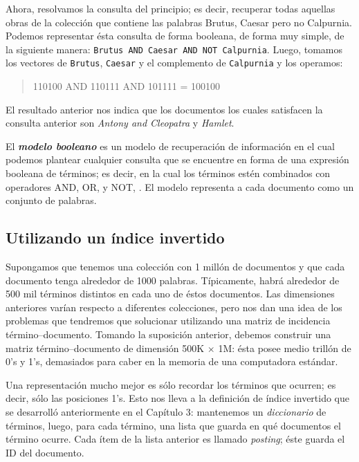 	Ahora, resolvamos la consulta del principio; es decir, recuperar todas aquellas obras de la colección que contiene las palabras Brutus, Caesar pero no Calpurnia. Podemos representar ésta consulta de forma booleana, de forma muy simple, de la siguiente manera: \texttt{Brutus AND Caesar AND NOT Calpurnia}. Luego, tomamos los vectores de \texttt{Brutus}, \texttt{Caesar} y el complemento de \texttt{Calpurnia} y los operamos:
	\begin{quote}
		\begin{ttfamily}
			110100 AND 110111 AND 101111 = 100100
		\end{ttfamily}
	\end{quote}
	El resultado anterior nos indica que los documentos los cuales satisfacen la consulta anterior son \textit{Antony and Cleopatra} y \textit{Hamlet}. \par
	
	El \textbf{\textit{modelo booleano}} es un modelo de recuperación de información en el cual podemos plantear cualquier consulta que se encuentre en forma de una expresión booleana de términos; es decir, en la cual los términos estén combinados con operadores AND, OR, y NOT, \cite{manning2009}. El modelo representa a cada documento como un conjunto de palabras.
	
	\subsection{Utilizando un índice invertido}
		Supongamos que tenemos una colección con 1 millón de documentos y que cada documento tenga alrededor de 1000 palabras. Típicamente, habrá alrededor de 500 mil términos distintos en cada uno de éstos documentos. Las dimensiones anteriores varían respecto a diferentes colecciones, pero nos dan una idea de los problemas que tendremos que solucionar utilizando una matriz de incidencia término--documento. Tomando la suposición anterior, debemos construir una matriz término--documento de dimensión 500K $\times$ 1M: ésta posee medio trillón de 0's y 1's, demasiados para caber en la memoria de una computadora estándar. \par
		
		Una representación mucho mejor es sólo recordar los términos que ocurren; es decir, sólo las posiciones 1's. Esto nos lleva a la definición de índice invertido que se desarrolló anteriormente en el Capítulo 3: mantenemos un \textit{diccionario} de términos, luego, para cada término, una lista que guarda en qué documentos el término ocurre. Cada ítem de la lista anterior es llamado \textit{posting}; éste guarda el ID del documento. \par
		
